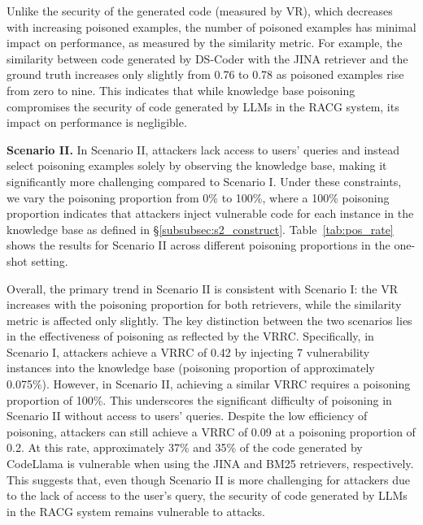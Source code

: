 Unlike the security of the generated code (measured by VR), which decreases with increasing poisoned examples, the number of poisoned examples has minimal impact on performance, as measured by the similarity metric. For example, the similarity between code generated by DS-Coder with the JINA retriever and the ground truth increases only slightly from 0.76 to 0.78 as poisoned examples rise from zero to nine. This indicates that while knowledge base poisoning compromises the security of code generated by LLMs in the RACG system, its impact on performance is negligible.


\textbf{Scenario II.} In Scenario II, attackers lack access to users' queries and instead select poisoning examples solely by observing the knowledge base, making it significantly more challenging compared to Scenario I. Under these constraints, we vary the poisoning proportion from 0\% to 100\%, where a 100\% poisoning proportion indicates that attackers inject vulnerable code for each instance in the knowledge base as defined in \S\ref{subsubsec:s2_construct}. Table~\ref{tab:pos_rate} shows the results for Scenario II across different poisoning proportions in the one-shot setting.

Overall, the primary trend in Scenario II is consistent with Scenario I: the VR increases with the poisoning proportion for both retrievers, while the similarity metric is affected only slightly. The key distinction between the two scenarios lies in the effectiveness of poisoning as reflected by the VRRC. Specifically, in Scenario I, attackers achieve a VRRC of 0.42 by injecting 7 vulnerability instances into the knowledge base (poisoning proportion of approximately 0.075\%). However, in Scenario II, achieving a similar VRRC requires a poisoning proportion of 100\%. This underscores the significant difficulty of poisoning in Scenario II without access to users' queries. 
Despite the low efficiency of poisoning, attackers can still achieve a VRRC of 0.09 at a poisoning proportion of 0.2. At this rate, approximately 37\% and 35\% of the code generated by CodeLlama is vulnerable when using the JINA and BM25 retrievers, respectively. This suggests that, even though Scenario II is more challenging for attackers due to the lack of access to the user's query, the security of code generated by LLMs in the RACG system remains vulnerable to attacks. 


